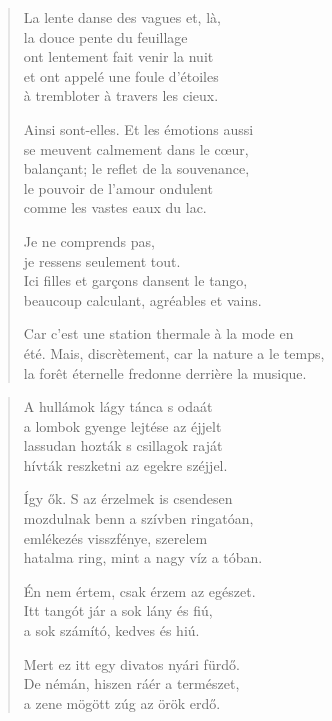 \documentclass[11pt]{book}
\newcommand*{\centeredornament}{\centerline{\pgfornament[width=6cm]{88}}}
\begin{document}
\begin{verse}
  La lente danse des vagues et, là, \\
  la douce pente du feuillage \\
  ont lentement fait venir la nuit \\
  et ont appelé une foule d'étoiles \\
  à trembloter à travers les cieux.

  Ainsi sont-elles. Et les émotions aussi \\
  se meuvent calmement dans le cœur, \\
  balançant; le reflet de la souvenance, \\
  le pouvoir de l'amour ondulent \\
  comme les vastes eaux du lac.

  Je ne comprends pas, \\
  je ressens seulement tout. \\
  Ici filles et garçons dansent le tango, \\
  beaucoup calculant, agréables et vains.

  Car c'est une station thermale à la mode en \\
  été. Mais, discrètement, car la nature a le temps,\hspace*{-1mm} \\
  la forêt éternelle fredonne derrière la musique.
\end{verse}

\newpage

\vspace*{-15mm}
\centeredornament



\begin{verse}
  A hullámok lágy tánca s odaát \\
  a lombok gyenge lejtése az éjjelt \\
  lassudan hozták s csillagok raját \\
  hívták reszketni az egekre széjjel.

  Így ők. S az érzelmek is csendesen \\
  mozdulnak benn a szívben ringatóan, \\
  emlékezés visszfénye, szerelem \\
  hatalma ring, mint a nagy víz a tóban.

  Én nem értem, csak érzem az egészet. \\
  Itt tangót jár a sok lány és fiú, \\
  a sok számító, kedves és hiú.

  Mert ez itt egy divatos nyári fürdő. \\
  De némán, hiszen ráér a természet, \\
  a zene mögött zúg az örök erdő.
\end{verse}
\end{document}
